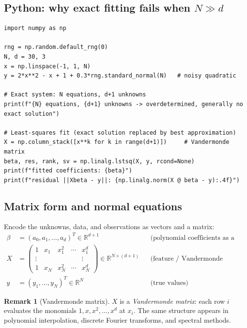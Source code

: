 \documentclass[11pt]{article}
\theoremstyle{definition}
\newtheorem{remark}{Remark}[section]
\theoremstyle{plain}
\begin{document}
\subsection{Python: why exact fitting fails when $N \gg d$}
\begin{lstlisting}
import numpy as np

rng = np.random.default_rng(0)
N, d = 30, 3
x = np.linspace(-1, 1, N)
y = 2*x**2 - x + 1 + 0.3*rng.standard_normal(N)   # noisy quadratic

# Exact system: N equations, d+1 unknowns
print(f"{N} equations, {d+1} unknowns -> overdetermined, generally no exact solution")

# Least-squares fit (exact solution replaced by best approximation)
X = np.column_stack([x**k for k in range(d+1)])     # Vandermonde matrix
beta, res, rank, sv = np.linalg.lstsq(X, y, rcond=None)
print(f"fitted coefficients: {beta}")
print(f"residual ||Xbeta - y||: {np.linalg.norm(X @ beta - y):.4f}")
\end{lstlisting}

\subsection{Matrix form and normal equations}

Encode the unknowns, data, and observations as vectors and a matrix:
\begin{align*}
  \beta &= (a_0, a_1, \ldots, a_d)^T \in \mathbb{R}^{d+1}
           &&\text{(polynomial coefficients as a vector)}\\
  X &= \begin{pmatrix}
         1 & x_1 & x_1^2 & \cdots & x_1^d \\
         \vdots & & & & \vdots \\
         1 & x_N & x_N^2 & \cdots & x_N^d
       \end{pmatrix} \in \mathbb{R}^{N\times(d+1)}
       &&\text{(feature / Vandermonde matrix)}\\
  y &= (y_1, \ldots, y_N)^T \in \mathbb{R}^N
       &&\text{(true values)}
\end{align*}

\begin{remark}[Vandermonde matrix]
  $X$ is a \emph{Vandermonde matrix}: each row $i$ evaluates the monomials
  $1, x, x^2, \ldots, x^d$ at $x_i$.  The same structure appears in
  polynomial interpolation, discrete Fourier transforms, and spectral
  methods.
\end{remark}
\end{document}
